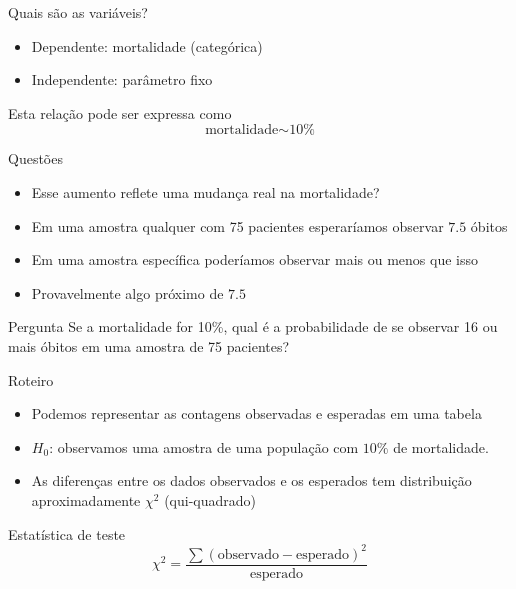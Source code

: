 \documentclass{beamer}
\begin{document}
\begin{frame}{Quais são as variáveis?}
  \begin{itemize}
    \small
  \item Dependente: mortalidade (categórica)
  \item Independente: parâmetro fixo
  \end{itemize}
  \vfill
  \begin{block}{Esta relação pode ser expressa como}
    \begin{displaymath}
      \text{mortalidade} \sim \text{10\%}
    \end{displaymath}
  \end{block}
\end{frame}

\begin{frame}{Questões}
  \begin{itemize}
  \item Esse aumento reflete uma mudança real na mortalidade?
  \item Em uma amostra qualquer com 75 pacientes esperaríamos observar $7.5$ óbitos
  \item Em uma amostra específica poderíamos observar mais ou menos
    que isso
  \item Provavelmente algo próximo de $7.5$
  \end{itemize}

  \begin{block}{Pergunta}
    Se a mortalidade for 10\%, qual é a probabilidade de se observar
    16 ou mais óbitos em uma amostra de 75 pacientes?
  \end{block}
\end{frame}

\begin{frame}{Roteiro}
  \begin{itemize}
    \small
  \item Podemos representar as contagens observadas e esperadas em uma tabela
  \item $H_0$: \alert{observamos uma amostra de uma população com
      $10\%$ de mortalidade}.
  \item As diferenças entre os dados observados e os esperados tem
    distribuição aproximadamente $\chi^2$ (qui-quadrado)
  \end{itemize}
  \begin{block}{Estatística de teste}
    $$\chi^2 = \frac{\sum (\text{observado} - \text{esperado})^2 }{\text{esperado}}$$
  \end{block}
\end{frame}
\end{document}
